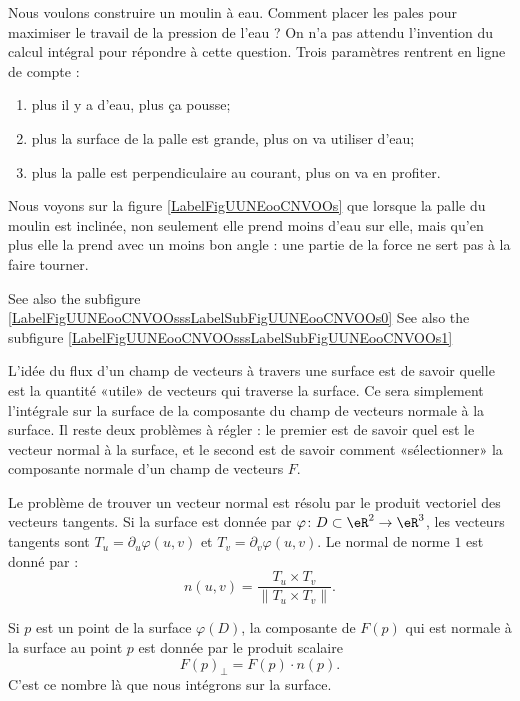 Nous voulons construire un moulin à eau. Comment placer les pales pour maximiser le travail de la pression de l'eau ? On n'a pas attendu l'invention du calcul intégral pour répondre à cette question. Trois paramètres rentrent en ligne de compte :
\begin{enumerate}
    \item
        plus il y a d'eau, plus ça pousse;
    \item
        plus la surface de la palle est grande, plus on va utiliser d'eau;
    \item
        plus la palle est perpendiculaire au courant, plus on va en profiter.
\end{enumerate}
Nous voyons sur la figure \ref{LabelFigUUNEooCNVOOs} que lorsque la palle du moulin est inclinée, non seulement elle prend moins d'eau sur elle, mais qu'en plus elle la prend avec un moins bon angle : une partie de la force ne sert pas à la faire tourner.

\newcommand{\CaptionFigUUNEooCNVOOs}{La partie rouge de la force est perdue si l'eau ne pousse pas perpendiculairement. De plus lorsque la palle est inclinée, elle prend moins d'eau sur elle.}

See also the subfigure \ref{LabelFigUUNEooCNVOOsssLabelSubFigUUNEooCNVOOs0}
See also the subfigure \ref{LabelFigUUNEooCNVOOsssLabelSubFigUUNEooCNVOOs1}

L'idée du flux d'un champ de vecteurs à travers une surface est de savoir quelle est la quantité «utile» de vecteurs qui traverse la surface. Ce sera simplement l'intégrale sur la surface de la composante du champ de vecteurs normale à la surface. Il reste deux problèmes à régler : le premier est de savoir quel est le vecteur normal à la surface, et le second est de savoir comment «sélectionner» la composante normale d'un champ de vecteurs $F$.

Le problème de trouver un vecteur normal est résolu par le produit vectoriel des vecteurs tangents. Si la surface est donnée par $\varphi\colon D\subset\eR^2\to \eR^3$, les vecteurs tangents sont $T_u=\partial_u\varphi(u,v)$ et  $T_v=\partial_v\varphi(u,v)$. Le normal de norme $1$ est donné par :
\begin{equation}
    n(u,v)=\frac{ T_u\times T_v }{ \| T_u\times T_v \| }.
\end{equation}

Si $p$ est un point de la surface $\varphi(D)$, la composante de $F(p)$ qui est normale à la surface au point $p$ est donnée par le produit scalaire
\begin{equation}
    F(p)_{\perp}=F(p)\cdot n(p).
\end{equation}
C'est ce nombre là que nous intégrons sur la surface. 

